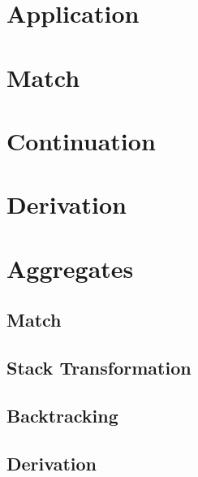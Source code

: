 

%

\section{Application}



\section{Match}





\section{Continuation}




\section{Derivation}





\section{Aggregates}
\subsection{Match}




\subsection{Stack Transformation}

\subsection{Backtracking}



\subsection{Derivation}

